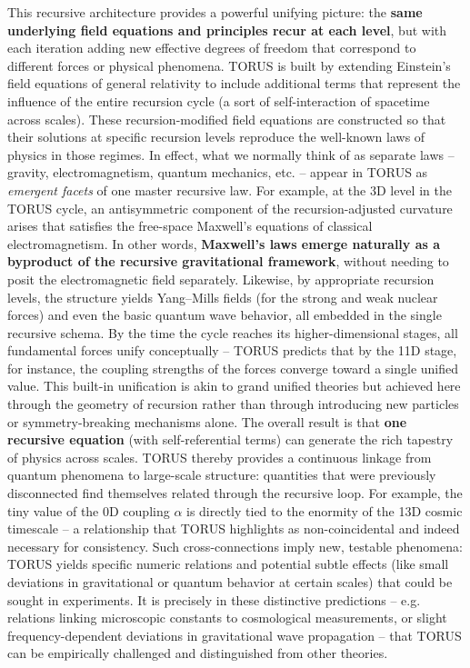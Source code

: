 \documentclass[
]{article}
\begin{document}
This recursive architecture provides a powerful unifying picture: the
\textbf{same underlying field equations and principles recur at each
level}, but with each iteration adding new effective degrees of freedom
that correspond to different forces or physical phenomena. TORUS is
built by extending Einstein's field equations of general relativity to
include additional terms that represent the influence of the entire
recursion cycle (a sort of self-interaction of spacetime across
scales)\hspace{0pt}. These recursion-modified field equations are
constructed so that their solutions at specific recursion levels
reproduce the well-known laws of physics in those regimes. In effect,
what we normally think of as separate laws -- gravity, electromagnetism,
quantum mechanics, etc. -- appear in TORUS as \emph{emergent facets} of
one master recursive law. For example, at the 3D level in the TORUS
cycle, an antisymmetric component of the recursion-adjusted curvature
arises that satisfies the free-space Maxwell's equations of classical
electromagnetism\hspace{0pt}. In other words, \textbf{Maxwell's laws
emerge naturally as a byproduct of the recursive gravitational
framework}, without needing to posit the electromagnetic field
separately\hspace{0pt}. Likewise, by appropriate recursion levels, the
structure yields Yang--Mills fields (for the strong and weak nuclear
forces) and even the basic quantum wave behavior, all embedded in the
single recursive schema. By the time the cycle reaches its
higher-dimensional stages, all fundamental forces unify conceptually --
TORUS predicts that by the 11D stage, for instance, the coupling
strengths of the forces converge toward a single unified
value\hspace{0pt}. This built-in unification is akin to grand unified
theories but achieved here through the geometry of recursion rather than
through introducing new particles or symmetry-breaking mechanisms alone.
The overall result is that \textbf{one recursive equation} (with
self-referential terms) can generate the rich tapestry of physics across
scales. TORUS thereby provides a continuous linkage from quantum
phenomena to large-scale structure: quantities that were previously
disconnected find themselves related through the recursive loop. For
example, the tiny value of the 0D coupling $\alpha$ is directly tied to the
enormity of the 13D cosmic timescale -- a relationship that TORUS
highlights as non-coincidental and indeed necessary for
consistency\hspace{0pt}. Such cross-connections imply new, testable
phenomena: TORUS yields specific numeric relations and potential subtle
effects (like small deviations in gravitational or quantum behavior at
certain scales) that could be sought in experiments\hspace{0pt}. It is
precisely in these distinctive predictions -- e.g. relations linking
microscopic constants to cosmological measurements\hspace{0pt}, or
slight frequency-dependent deviations in gravitational wave propagation
-- that TORUS can be empirically challenged and distinguished from other
theories.
\end{document}
